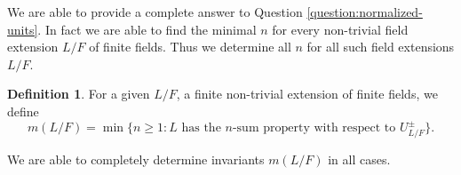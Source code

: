 \documentclass[11pt, a4paper]{amsart}
\theoremstyle{definition}
\newtheorem{definition}[thm]{Definition}
\numberwithin{equation}{section}
\begin{document}

We are able to provide a complete answer to Question \ref{question:normalized-units}. In fact we are able to find the minimal $n$ for every non-trivial field extension $L/F$ of finite fields. Thus we determine all $n$ for all such field extensions $L/F$.

\begin{definition}
For a given $L/F$, a finite non-trivial extension of finite fields, we define
\[
m(L/F)=\min\{n\geq 1 : L \text{ has the } n\text{-sum property with respect to }
U_{L/F}^{\pm}\}.
\]
\end{definition}

We are able to completely determine invariants $m(L/F)$ in all cases.
\end{document}
